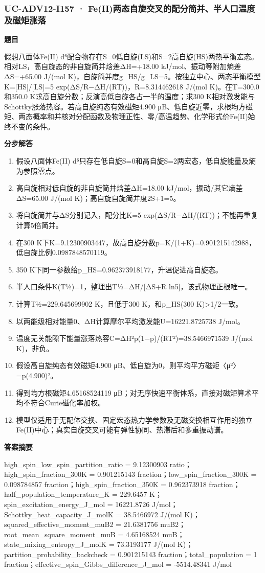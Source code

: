 \documentclass[UTF8,11pt,a4paper]{ctexart}
\begin{document}
\subsubsection*{UC-ADV12-I157 · Fe(II)两态自旋交叉的配分简并、半人口温度及磁矩涨落}
\noindent\textbf{题目}\par
假想八面体Fe(II) d⁶配合物存在S=0低自旋(LS)和S=2高自旋(HS)两热平衡宏态。相对LS，高自旋态的非自旋简并焓差ΔH=+18.00 kJ/mol、振动等附加熵差ΔS=+65.00 J/(mol K)，自旋简并度g\_HS/g\_LS=5。按独立中心、两态平衡模型K=[HS]/[LS]=5 exp(ΔS/R−ΔH/(RT))，R=8.314462618 J/(mol K)。在T=300.0和350.0 K求高自旋分数；反演高低自旋各占一半的温度；求300 K相对激发能与Schottky涨落热容。若高自旋纯态有效磁矩4.900 μB、低自旋近零，求根均方磁矩、两态概率和并核对分配函数及物理正性、零/高温趋势、化学形式价Fe(II)始终不变的条件。\par
\medskip\noindent\textbf{分步解答}
\begin{enumerate}
\item 假设八面体Fe(II) d⁶只存在低自旋S=0和高自旋S=2两宏态，低自旋能量及熵为参照零点。
\item 高自旋相对低自旋的非自旋简并焓差ΔH=18.00 kJ/mol，振动/其它熵差ΔS=65.00 J/(mol K)；高自旋自旋简并度2S+1=5。
\item 将自旋简并与ΔS分别记入，配分比K=5 exp(ΔS/R−ΔH/(RT))；不能再重复计算5倍简并。
\item 在300 K下K=9.12300903447，故高自旋分数p=K/(1+K)=0.901215142988，低自旋比例0.0987848570119。
\item 350 K下同一参数给p\_HS=0.962373918177，升温促进高自旋态。
\item 半人口条件K(T½)=1，整理出T½=ΔH/[ΔS+R ln5]，该式物理正根唯一。
\item 计算T½=229.645699902 K，且低于300 K，和p\_HS(300 K)>1/2一致。
\item 以两能级相对能量0、ΔH计算摩尔平均激发能U=16221.8725738 J/mol。
\item 温度无关能隙下能量涨落热容C=ΔH²p(1−p)/(RT²)=38.5466971539 J/(mol K)，非负。
\item 假设高自旋纯态有效磁矩4.900 μB、低自旋为0，则平均平方磁矩〈μ²〉=p(4.900)²。
\item 得到均方根磁矩4.65168524119 μB；对无序快速平衡体系，直接对磁矩算术平均不符合Curie磁化率加权。
\item 模型仅适用于无配体交换、固定宏态热力学参数及无磁交换相互作用的独立Fe(II)中心；真实自旋交叉可能有弹性协同、热滞后和多重振动谱。
\end{enumerate}
\noindent\textbf{答案摘要}\par
high\_spin\_low\_spin\_partition\_ratio = 9.12300903 ratio；high\_spin\_fraction\_300K = 0.901215143 fraction；low\_spin\_fraction\_300K = 0.098784857 fraction；high\_spin\_fraction\_350K = 0.962373918 fraction；half\_population\_temperature\_K = 229.6457 K；spin\_excitation\_energy\_J\_mol = 16221.8726 J/mol；Schottky\_heat\_capacity\_J\_molK = 38.5466972 J/(mol K)；squared\_effective\_moment\_muB2 = 21.6381756 muB2；root\_mean\_square\_moment\_muB = 4.65168524 muB；state\_mixing\_entropy\_J\_molK = 73.3193177 J/(mol K)；partition\_probability\_backcheck = 0.901215143 fraction；total\_population = 1 fraction；effective\_spin\_Gibbs\_difference\_J\_mol = -5514.48341 J/mol\par
\end{document}

